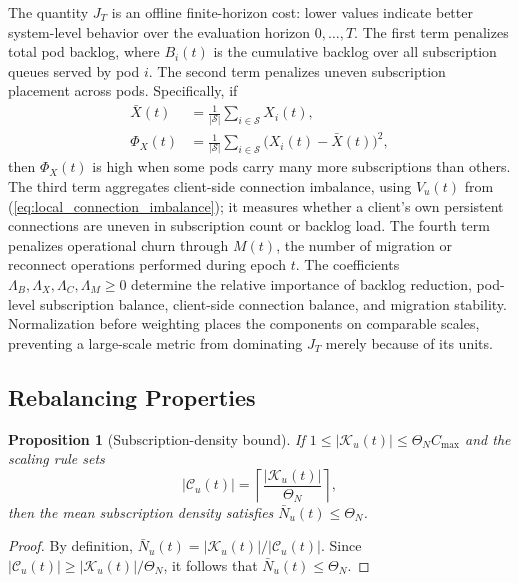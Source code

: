 \documentclass[manuscript]{acmart}
\newtheorem{proposition}{Proposition}
\begin{document}
The quantity $J_T$ is an offline finite-horizon cost: lower values indicate
better system-level behavior over the evaluation horizon $0,\ldots,T$. The
first term penalizes total pod backlog, where $B_i(t)$ is the cumulative
backlog over all subscription queues served by pod $i$. The second term
penalizes uneven subscription placement across pods. Specifically, if
\begin{align*}
	\bar{X}(t)
	&=\frac{1}{|\mathcal{S}|}\sum_{i\in\mathcal{S}}X_i(t),\\
	\Phi_X(t)
	&=\frac{1}{|\mathcal{S}|}
	\sum_{i\in\mathcal{S}}\bigl(X_i(t)-\bar{X}(t)\bigr)^2,
\end{align*}
then $\Phi_X(t)$ is high when some pods carry many more subscriptions than
others. The third term aggregates client-side connection imbalance, using
$V_u(t)$ from (\ref{eq:local_connection_imbalance}); it measures whether a
client's own persistent connections are uneven in subscription count or
backlog load. The fourth term penalizes operational churn through $M(t)$, the
number of migration or reconnect operations performed during epoch $t$.
The coefficients
$\Lambda_B,\Lambda_X,\Lambda_C,\Lambda_M\geq 0$ determine the relative
importance of backlog reduction, pod-level subscription balance, client-side
connection balance, and migration stability. Normalization before weighting
places the components on comparable scales, preventing a large-scale metric
from dominating $J_T$ merely because of its units.

\subsection{Rebalancing Properties}

\begin{proposition}[Subscription-density bound]
If $1\leq|\mathcal{K}_u(t)|\leq \Theta_N C_{\max}$ and the scaling rule sets
\begin{equation}
	|\mathcal{C}_u(t)| =
	\left\lceil\frac{|\mathcal{K}_u(t)|}{\Theta_N}\right\rceil,
\end{equation}
then the mean subscription density satisfies $\bar{N}_u(t)\leq\Theta_N$.
\end{proposition}

\begin{proof}
By definition, $\bar{N}_u(t)=|\mathcal{K}_u(t)|/|\mathcal{C}_u(t)|$. Since
$|\mathcal{C}_u(t)|\geq |\mathcal{K}_u(t)|/\Theta_N$, it follows that
$\bar{N}_u(t)\leq\Theta_N$.
\end{proof}
\end{document}
